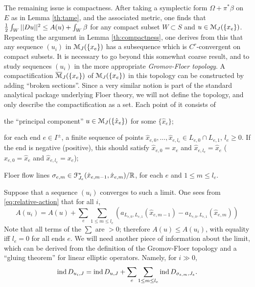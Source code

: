 \documentclass[10pt,letterpaper]{article}
\begin{document}
The remaining issue is compactness. After taking a symplectic form $\Omega +
\pi^*\beta$ on $E$ as in Lemma \ref{th:tame}, and the associated metric, one
finds that ${\textstyle\frac{1}{2}} \int_W || Du ||^2 \leq A(u) + \int_W \beta$ for any compact
subset $W \subset S$ and $u \in \mathcal{M}_J(\{x_e\})$. Repeating the argument in
Lemma \ref{th:compactness}, one derives from this that any sequence $(u_i)$ in
$\mathcal{M}_J(\{x_e\})$ has a subsequence which is $C^r$-convergent on compact
subsets. It is necessary to go beyond this somewhat coarse result, and to study
sequences $(u_i)$ in the more appropriate {\em Gromov-Floer topology}. A
compactification $\overline{\mathcal{M}}_J(\{x_e\})$ of $\mathcal{M}_J(\{x_e\})$ in this
topology can be constructed by adding ``broken sections''. Since a very similar
notion is part of the standard analytical package underlying Floer theory, we
will not define the topology, and only describe the compactification as a set.
Each point of it consists of
\begin{condensedlist}
\item
the ``principal component'' $u \in \mathcal{M}_J(\{\hat{x}_e\})$ for some
$\{\hat{x}_e\}$;
\item
for each end $e \in I^{\pm}$, a finite sequence of points $\hat{x}_{e,0},
\dots, \hat{x}_{e,l_e} \in L_{e,0} \cap L_{e,1}$, $l_e \geq 0$. If the end is
negative (positive), this should satisfy $\hat{x}_{e,0} = x_e$ and
$\hat{x}_{e,l_e} = \hat{x}_e$ ($\hat{x}_{e,0} = \hat{x}_e$ and $\hat{x}_{e,l_e}
= x_e$);
\item
Floer flow lines $\sigma_{e,m} \in
\mathcal{F}^*_{J_e}(\hat{x}_{e,m-1},\hat{x}_{e,m})/\mathbb{R}$, for each $e$ and $1 \leq m \leq
l_e$.
\end{condensedlist}
Suppose that a sequence $(u_i)$ converges to such a limit. One sees from
\eqref{eq:relative-action} that for all $i$,
\begin{equation} \label{eq:energy-additivity}
 A(u_i) = A(u) + \sum_e \sum_{1 \leq m \leq l_e}
 (a_{L_{e,0},L_{e,1}}(\hat{x}_{e,m-1}) - a_{L_{e,0},L_{e,1}}(\hat{x}_{e,m}))
\end{equation}
Note that all terms of the $\sum$ are $>0$; therefore $A(u) \leq A(u_i)$, with
equality iff $l_e = 0$ for all ends $e$. We will need another piece of
information about the limit, which can be derived from the definition of the
Gromov-Floer topology and a ``gluing theorem'' for linear elliptic operators.
Namely, for $i \gg 0$,
\begin{equation} \label{eq:index-additivity}
 \mathrm{ind}\,D_{u_i,J} = \mathrm{ind} \, D_{u,J} + \sum_e \sum_{1 \leq m \leq l_e}
 \mathrm{ind} \, D_{\sigma_{e,m},J_e}.
\end{equation}
\end{document}
